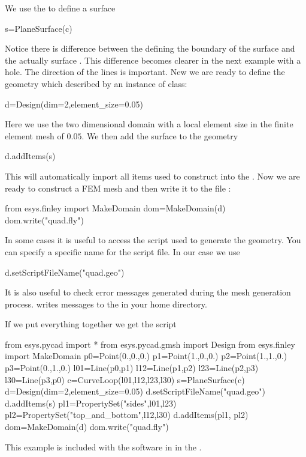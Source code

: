 We use the  to define a surface 
\begin{python}
s=PlaneSurface(c)
\end{python}
Notice there is difference between the  defining the boundary 
of the surface and the actually surface . This difference becomes clearer in the next example with a hole. The direction of the lines is important. 
New we are ready to define the geometry which described by an instance of  class:
\begin{python}
d=Design(dim=2,element_size=0.05)
\end{python}
Here we use the two dimensional domain with a local element size in the finite element mesh of $0.05$.
We then add the surface  to the geometry
\begin{python}
d.addItems(s)
\end{python}
This will automatically import all items used to construct  into the  . 
Now we are ready to construct a \finley FEM mesh and then write it to the file :
\begin{python}
from esys.finley import MakeDomain
dom=MakeDomain(d)
dom.write("quad.fly")
\end{python}
In some cases it is useful to access the script used to generate the geometry. You can specify a specific name
for the script file. In our case we use 
\begin{python}
d.setScriptFileName("quad.geo")
\end{python}
It is also useful to check error messages generated during the mesh generation process. \gmshextern writes
messages to the  in your home directory.

If we put everything together we get the script
\begin{python}
from esys.pycad import *
from esys.pycad.gmsh import Design
from esys.finley import MakeDomain
p0=Point(0.,0.,0.)
p1=Point(1.,0.,0.)
p2=Point(1.,1.,0.)
p3=Point(0.,1.,0.)
l01=Line(p0,p1)
l12=Line(p1,p2)
l23=Line(p2,p3)
l30=Line(p3,p0)
c=CurveLoop(l01,l12,l23,l30)
s=PlaneSurface(c)
d=Design(dim=2,element_size=0.05)
d.setScriptFileName("quad.geo")
d.addItems(s)
pl1=PropertySet("sides",l01,l23)
pl2=PropertySet("top_and_bottom",l12,l30)
d.addItems(pl1, pl2)
dom=MakeDomain(d)
dom.write("quad.fly")
\end{python}
This example is included with the software in
 in the \ExampleDirectory. 

